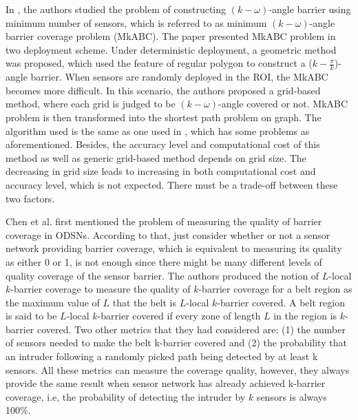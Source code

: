 In \cite{xu2016minimum}, the authors studied the problem of constructing $(k-\omega)$-angle barrier using minimum number of sensors, which is referred to as minimum $(k-\omega)$-angle barrier coverage problem (MkABC). The paper presented MkABC problem in two deployment scheme. Under deterministic deployment, a geometric method was proposed, which used the feature of regular polygon to construct a ($k-\displaystyle\frac{\pi}{k}$)-angle barrier. When sensors are randomly deployed in the ROI, the MkABC becomes more difficult. In this scenario, the authors proposed a grid-based method, where each grid is judged to be $(k-\omega)$-angle covered or not. MkABC problem is then transformed into the shortest path problem on graph. The algorithm used is the same as one used in \cite{ma2012minimum}, which has some problems as aforementioned. Besides, the accuracy level and computational cost of this method as well as generic grid-based method depends on grid size. The decreasing in grid size leads to increasing in both computational cost and accuracy level, which is not expected. There must be a trade-off between these two factors.

Chen et al. \cite{chen2008measuring} first mentioned the problem of measuring the quality of barrier coverage in ODSNs. According to that, just consider whether or not a sensor network providing barrier coverage, which is equivalent to measuring its quality as either 0 or 1, is not enough since there might be many different levels of quality coverage of the sensor barrier. The authors produced the notion of $L$-local $k$-barrier coverage to measure the quality of $k$-barrier coverage for a belt region as the maximum value of $L$ that the belt is $L$-local $k$-barrier covered. A belt region is said to be $L$-local $k$-barrier covered if every zone of length $L$ in the region is $k$-barrier covered. Two other metrics that they had considered are: (1) the number of sensors needed to make the belt k-barrier covered and (2) the probability that an intruder following a randomly picked path being detected by at least k sensors. All these metrics can measure the coverage quality, however, they always provide the same result when sensor network has already achieved k-barrier coverage, i.e, the probability of detecting the intruder by $k$ sensors is always 100\%.

